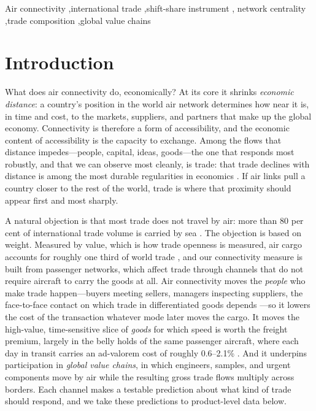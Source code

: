 \begin{frontmatter}
\begin{keyword}
Air connectivity \sep international trade \sep shift-share instrument \sep
network centrality \sep trade composition \sep global value chains
\end{keyword}

\end{frontmatter}

\linenumbers

\section{Introduction}
What does air connectivity do, economically? At its core it shrinks
\emph{economic distance}: a country's position in the world air network
determines how near it is, in time and cost, to the markets, suppliers, and
partners that make up the global economy. Connectivity is therefore a form of
accessibility, and the economic content of accessibility is the capacity to
exchange. Among the flows that distance impedes---people, capital, ideas,
goods---the one that responds most robustly, and that we can observe most
cleanly, is trade: that trade declines with distance is among the most durable
regularities in economics \citep{Redding_2004,Hummels_2007}. If air links pull
a country closer to the rest of the world, trade is where that proximity should
appear first and most sharply.

A natural objection is that most trade does not travel by air: more than 80
per cent of international trade volume is carried by sea \citep{UNCTAD_2021}.
The objection is based on weight. Measured by value, which is how trade
openness is measured, air cargo accounts for roughly one third of world trade
\citep{IATA_cargo}, and our connectivity measure is built from passenger
networks, which affect trade through channels that do not require aircraft to
carry the goods at all. Air connectivity moves the \emph{people} who make
trade happen---buyers meeting sellers, managers inspecting suppliers, the
face-to-face contact on which trade in differentiated goods depends
\citep{Rauch_1999,Cristea_2011,Startz_2016}---so it lowers the cost of the
transaction whatever mode later moves the cargo. It moves the high-value,
time-sensitive slice of \emph{goods} for which speed is worth the freight
premium, largely in the belly holds of the same passenger aircraft, where each
day in transit carries an ad-valorem cost of roughly 0.6--2.1\%
\citep{Hummels_2007,Hummels_2013}. And it underpins participation in
\emph{global value chains}, in which engineers, samples, and urgent components
move by air while the resulting gross trade flows multiply across borders.
Each channel makes a testable prediction about what kind of trade should
respond, and we take these predictions to product-level data below.

